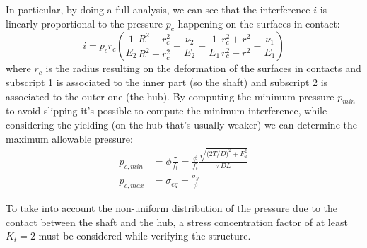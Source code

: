 \begin{multicols}
		In particular, by doing a full analysis, we can see that the interference $i$ is linearly proportional to the pressure $p_c$ happening on the surfaces in contact:
		\[ i = p_c r_c \left( \frac 1 {E_2} \frac{R^2+r_c^2}{R^2-r_c^2} + \frac{\nu_2}{E_2} + \frac{1}{E_1}  \frac{r_c^2 + r^2}{r_c^2 - r^2} - \frac{\nu_1}{E_1}\right) \]
		where $r_c$ is the radius resulting on the deformation of the surfaces in contacts and subscript 1 is associated to the inner part (so the shaft) and subscript 2 is associated to the outer one (the hub). By computing the minimum pressure $p_{min}$ to avoid slipping it's possible to compute the minimum interference, while considering the yielding (on the hub that's usually weaker) we can determine the maximum allowable pressure:
		\begin{equation}
		\begin{split}
			p_{c,min} & = \phi \frac \tau {f_t} = \frac{\phi}{f_t} \frac{\sqrt{\big(2 T/D\big)^2 + F_a^2}}{\pi DL} \\
			p_{c,max} & = \sigma_{eq} = \frac{\sigma_y}{\phi}
		\end{split}
		\end{equation}
		
		To take into account the non-uniform distribution of the pressure due to the contact between the shaft and the hub, a stress concentration factor of at least $K_t = 2$ must be considered while verifying the structure.
		
		
	
	
	
	
	
	
	
	
	
	
	
	
	
	
	
	
	
	
	
	
	
	
	
	
	
	
	
	
	
	
	
	
	
	
	
	
	
	
	
	

\end{multicols}